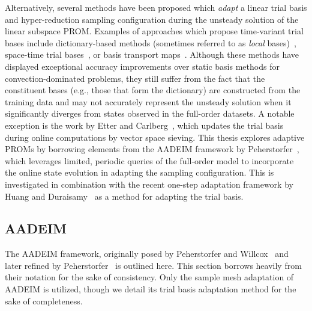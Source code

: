 Alternatively, several methods have been proposed which \textit{adapt} a linear trial basis and hyper-reduction sampling configuration during the unsteady solution of the linear subspace PROM. Examples of approaches which propose time-variant trial bases include dictionary-based methods (sometimes referred to as \textit{local} bases)~\cite{Amsallem2012,Peherstorfer2014,Abgrall2016}, space-time trial bases~\cite{Choi2019,Hoang2022}, or basis transport maps~\cite{Iollo2014}. Although these methods have displayed exceptional accuracy improvements over static basis methods for convection-dominated problems, they still suffer from the fact that the constituent bases (e.g., those that form the dictionary) are constructed from the training data and may not accurately represent the unsteady solution when it significantly diverges from states observed in the full-order datasets. A notable exception is the work by Etter and Carlberg~\cite{Etter2019}, which updates the trial basis during online computations by vector space sieving. This thesis explores adaptive PROMs by borrowing elements from the AADEIM framework by Peherstorfer~\cite{Peherstorfer2015,Peherstorfer2020Adaptive}, which leverages limited, periodic queries of the full-order model to incorporate the online state evolution in adapting the sampling configuration. This is investigated in combination with the recent one-step adaptation framework by Huang and Duraisamy~\cite{Huang2022a} as a method for adapting the trial basis.

\subsection{AADEIM}

The AADEIM framework, originally posed by Peherstorfer and Willcox~\cite{Peherstorfer2015} and later refined by Peherstorfer~\cite{Peherstorfer2020Adaptive} is outlined here. This section borrows heavily from their notation for the sake of consistency. Only the sample mesh adaptation of AADEIM is utilized, though we detail its trial basis adaptation method for the sake of completeness.

